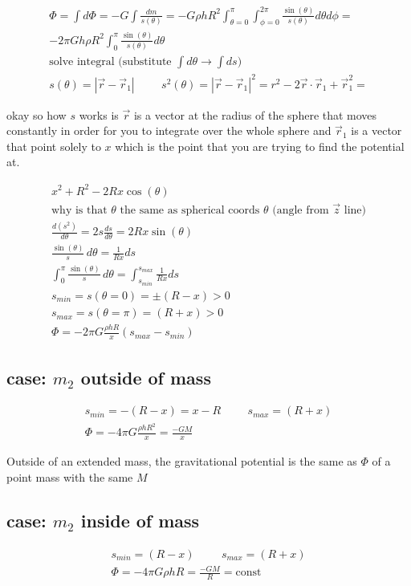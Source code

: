 \documentclass[fleqn]{report}
\newcommand{\hp}{\hspace{1cm}}
\newcommand{\const}{\textrm{const}}
\newcommand{\equations} [1] {
\begin{gather*}
#1
\end{gather*}
}
\begin{document}
\equations{
    \Phi = \int d \Phi = - G \int \frac{dm}{s(\theta)}
    =
    -G \rho h R^2 \int^\pi_{\theta = 0} \int^{2 \pi}_{\phi = 0} \frac{\sin (\theta)}{s(\theta)} d \theta d \phi  
    =
    \\
    -2 \pi G h \rho R^2 \int^{\pi}_{0} \frac{\sin(\theta)}{s(\theta)} d \theta
    \\
    \textrm{solve integral (substitute $\int d \theta \to \int ds)$}
    \\
    s(\theta) = |\vec r - \vec r_1| 
    \hp 
    s^2(\theta) = |\vec r - \vec r_1|^2 = {r}^2 - 2 \vec r \cdot \vec r_1 + \vec r_1^2
    =
}
okay so how $s$ works is $\vec r$ is a vector at the radius of the sphere that moves constantly in order for you to integrate over the whole sphere and $\vec r_1$ is a vector that point solely to $x$ which is the point that you are trying to find the potential at. 
\equations{
    x^2 + R^2 - 2R x \cos(\theta)
    \\
    \textrm{why is that $\theta$ the same as spherical coords $\theta$ (angle from $\vec z$ line)}
    \\
    \frac{d (s^2)}{d \theta} = 2 s \frac{ds}{d\theta} = 2 R x \sin (\theta)
    \\
    \frac{\sin (\theta)}{s} \, d \theta = \frac{1}{Rx} ds 
    \\
    \int^\pi_0 \frac{\sin (\theta)}{s} \, d \theta = 
    \int^{s_{max}}_{s_{min}}\frac{1}{Rx} ds 
    \\
    s_{min} = s(\theta = 0) = \pm (R - x) > 0
    \\
    s_{max} = s(\theta = \pi) = (R + x) > 0
    \\
    \Phi = - 2 \pi G \frac{\rho h R}{x} (s_{max} - s_{min})
}

\subsection{case: $m_2$ outside of mass}
\equations{
    s_{min} = -(R - x) = x - R 
    \hp
    s_{max} = (R + x) 
    \\
    \Phi = - 4 \pi G \frac{\rho h R^2}{x} = 
    \frac{-GM}{x}
}
Outside of an extended mass, the gravitational potential is the same as $\Phi$ of a point mass with the same $M$

\subsection{case: $m_2$ inside of mass}
\equations{
    s_{min} = (R - x) 
    \hp
    s_{max} = (R + x)
    \\
    \Phi = - 4 \pi G \rho h R = 
    \frac{-GM}{R} = \const
}
\end{document}
